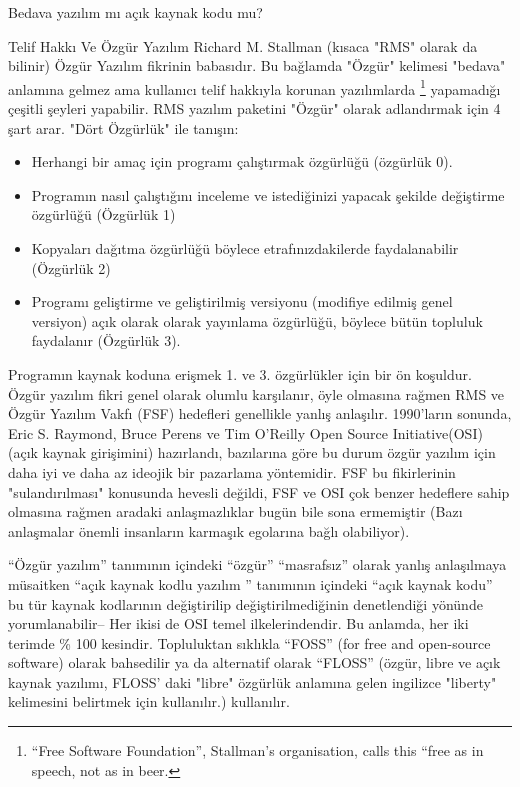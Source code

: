 \begin{section}{Bedava yazılım mı açık kaynak kodu mu?}
\begin{subsection}{Telif Hakkı Ve Özgür Yazılım}
Richard M. Stallman (kısaca "RMS" olarak da bilinir) Özgür Yazılım fikrinin babasıdır. Bu bağlamda "Özgür" kelimesi "bedava" anlamına gelmez ama kullanıcı telif hakkıyla korunan yazılımlarda
\footnote{“Free Software Foundation”, Stallman’s organisation, calls this “free as in speech, not as in beer.} yapamadığı çeşitli şeyleri yapabilir. RMS yazılım paketini "Özgür" olarak adlandırmak için 4 şart arar. "Dört Özgürlük" ile tanışın:

\begin{itemize}
 \item Herhangi bir amaç için programı çalıştırmak  özgürlüğü (özgürlük 0).
 \item Programın nasıl çalıştığını inceleme ve istediğinizi yapacak şekilde değiştirme özgürlüğü (Özgürlük 1)
 \item Kopyaları dağıtma özgürlüğü böylece etrafınızdakilerde faydalanabilir (Özgürlük 2)
 \item Programı geliştirme ve geliştirilmiş versiyonu (modifiye edilmiş genel versiyon) açık olarak olarak yayınlama özgürlüğü, böylece bütün topluluk
faydalanır (Özgürlük 3).
 \end{itemize}

Programın kaynak koduna erişmek 1. ve 3. özgürlükler için bir ön koşuldur. Özgür yazılım fikri genel olarak olumlu karşılanır, öyle olmasına rağmen RMS ve Özgür Yazılım Vakfı (FSF) hedefleri genellikle yanlış anlaşılır. 1990'ların sonunda, Eric S. Raymond, Bruce Perens ve Tim O'Reilly Open Source Initiative(OSI)(açık kaynak girişimini) hazırlandı, bazılarına göre bu durum özgür yazılım için daha iyi ve daha az ideojik bir pazarlama yöntemidir. FSF bu fikirlerinin "sulandırılması" konusunda hevesli değildi, FSF ve OSI çok benzer hedeflere sahip olmasına rağmen aradaki anlaşmazlıklar bugün bile sona ermemiştir (Bazı anlaşmalar önemli insanların karmaşık egolarına bağlı olabiliyor).

“Özgür yazılım” tanımının içindeki “özgür” “masrafsız” olarak yanlış anlaşılmaya müsaitken “açık kaynak kodlu yazılım ” tanımının içindeki “açık kaynak kodu” bu tür kaynak kodlarının değiştirilip değiştirilmediğinin denetlendiği yönünde yorumlanabilir-- Her ikisi de OSI temel ilkelerindendir. Bu anlamda, her iki terimde \% 100 kesindir. Topluluktan sıklıkla “FOSS” (for free and open-source software) olarak bahsedilir ya da alternatif olarak “FLOSS” (özgür, libre ve açık kaynak yazılımı, FLOSS' daki "libre" özgürlük anlamına gelen ingilizce "liberty" kelimesini belirtmek için kullanılır.) kullanılır.


\end{subsection}
\end{section}
